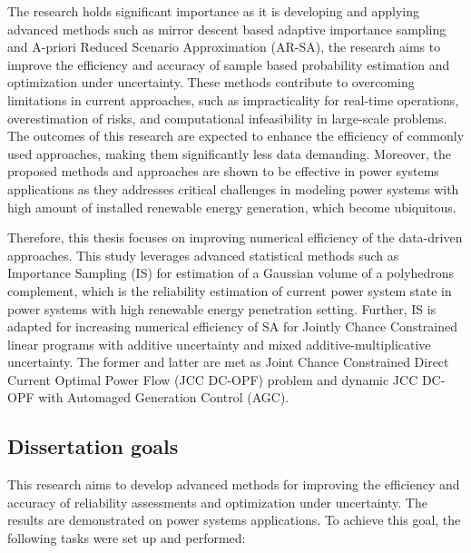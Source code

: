 The research holds significant importance as it is developing and applying advanced methods such as mirror descent based adaptive importance sampling and A-priori Reduced Scenario Approximation (AR-SA), the research aims to improve the efficiency and accuracy of sample based probability estimation and optimization under uncertainty. These methods contribute to overcoming limitations in current approaches, such as impracticality for real-time operations, overestimation of risks, and computational infeasibility in large-scale problems. The outcomes of this research are expected to enhance the efficiency of commonly used approaches, making them significantly less data demanding. Moreover, the proposed methods and approaches are shown to be effective in power systems applications as they addresses critical challenges in modeling power systems with high amount of installed renewable energy generation, which become ubiquitous.

Therefore, this thesis focuses on improving numerical efficiency of the data-driven approaches. This study leverages advanced statistical methods such as Importance Sampling (IS) for estimation of a Gaussian volume of a polyhedrons complement, which is the reliability estimation of current power system state in power systems with high renewable energy penetration setting. Further, IS is adapted for increasing numerical efficiency of SA for Jointly Chance Constrained linear programs with additive uncertainty and mixed additive-multiplicative uncertainty. The former and latter are met as Joint Chance Constrained Direct Current Optimal Power Flow (JCC DC-OPF) problem and dynamic JCC DC-OPF with Automaged Generation Control (AGC).



\subsection*{Dissertation goals} 



This research aims to develop advanced methods for improving the efficiency and accuracy of reliability assessments and optimization under uncertainty. The results are demonstrated on power systems applications.
To achieve this goal, the following tasks were set up and performed:

